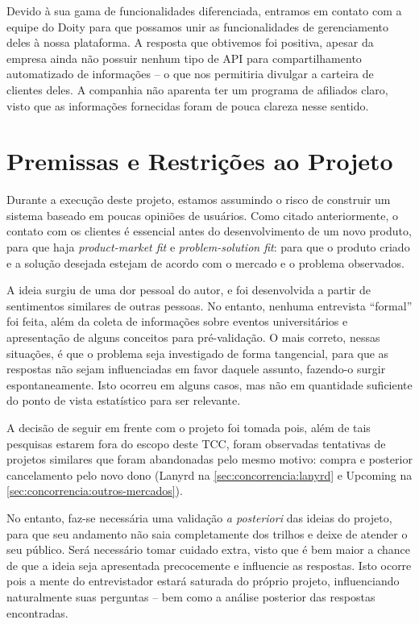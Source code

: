 \documentclass[12pt,a4paper,twoside,hyphens,english,brazil]{abntex2}
\begin{document}
Devido à sua gama de funcionalidades diferenciada, entramos em contato com a equipe do Doity para que possamos unir as funcionalidades de gerenciamento deles à nossa plataforma. A resposta que obtivemos foi positiva, apesar da empresa ainda não possuir nenhum tipo de API para compartilhamento automatizado de informações -- o que nos permitiria divulgar a carteira de clientes deles. A companhia não aparenta ter um programa de afiliados claro, visto que as informações fornecidas foram de pouca clareza nesse sentido. 


\section{Premissas e Restrições ao Projeto} \label{sec:premissas}

Durante a execução deste projeto, estamos assumindo o risco de construir um sistema baseado em poucas opiniões de usuários. Como citado anteriormente, o contato com os clientes é essencial antes do desenvolvimento de um novo produto, para que haja \emph{product-market fit} e \emph{problem-solution fit}: para que o produto criado e a solução desejada estejam de acordo com o mercado e o problema observados.\cite{bootstrapping}

A ideia surgiu de uma dor pessoal do autor, e foi desenvolvida a partir de sentimentos similares de outras pessoas. No entanto, nenhuma entrevista ``formal'' foi feita, além da coleta de informações sobre eventos universitários e apresentação de alguns conceitos para pré-validação. O mais correto, nessas situações, é que o problema seja investigado de forma tangencial, para que as respostas não sejam influenciadas em favor daquele assunto, fazendo-o surgir espontaneamente. Isto ocorreu em alguns casos, mas não em quantidade suficiente do ponto de vista estatístico para ser relevante.

A decisão de seguir em frente com o projeto foi tomada pois, além de tais pesquisas estarem fora do escopo deste TCC, foram observadas tentativas de projetos similares que foram abandonadas pelo mesmo motivo: compra e posterior cancelamento pelo novo dono (Lanyrd na \autoref{sec:concorrencia:lanyrd} e Upcoming na \autoref{sec:concorrencia:outros-mercados}).

No entanto, faz-se necessária uma validação \emph{a posteriori} das ideias do projeto, para que seu andamento não saia completamente dos trilhos e deixe de atender o seu público. Será necessário tomar cuidado extra, visto que é bem maior a chance de que a ideia seja apresentada precocemente e influencie as respostas. Isto ocorre pois a mente do entrevistador estará saturada do próprio projeto, influenciando naturalmente suas perguntas -- bem como a análise posterior das respostas encontradas.
\end{document}

